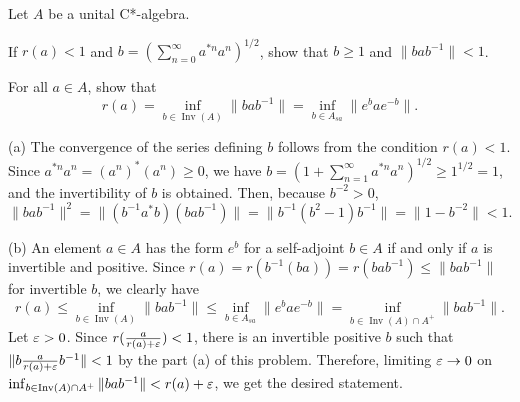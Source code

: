 \documentclass{../../small}
\newcommand{\Inv}{\operatorname{Inv}}
\begin{document}
\begin{prb}
Let $A$ be a unital C*-algebra.
\begin{parts}
\item
If $r(a)<1$ and $b=(\sum_{n=0}^\infty a^{*n}a^n)^{1/2}$, show that $b\ge1$ and $\|bab^{-1}\|<1$.
\item
For all $a\in A$, show that
\[r(a)=\inf_{b\in\Inv(A)}\|bab^{-1}\|=\inf_{b\in A_{sa}}\|e^bae^{-b}\|.\]
\end{parts}
\end{prb}
\begin{sol}
(a)
The convergence of the series defining $b$ follows from the condition $r(a)<1$.
Since $a^{*n}a^n=(a^n)^*(a^n)\ge0$, we have $b=(1+\sum_{n=1}^\infty a^{*n}a^n)^{1/2}\ge1^{1/2}=1$, and the invertibility of $b$ is obtained.
Then, because $b^{-2}>0$,
\[\|bab^{-1}\|^2=\|(b^{-1}a^*b)(bab^{-1})\|=\|b^{-1}(b^2-1)b^{-1}\|=\|1-b^{-2}\|<1.\]

(b)
An element $a\in A$ has the form $e^b$ for a self-adjoint $b\in A$ if and only if $a$ is invertible and positive.
Since $r(a)=r(b^{-1}(ba))=r(bab^{-1})\le\|bab^{-1}\|$ for invertible $b$, we clearly have
\[r(a)\le\inf_{b\in\Inv(A)}\|bab^{-1}\|\le\inf_{b\in A_{sa}}\|e^bae^{-b}\|=\inf_{b\in\Inv(A)\cap A^+}\|bab^{-1}\|.\]
Let $\varepsilon>0$.
Since $r(\frac a{r(a)+\varepsilon})<1$, there is an invertible positive $b$ such that $\|b\frac a{r(a)+\varepsilon}b^{-1}\|<1$ by the part (a) of this problem.
Therefore, limiting $\varepsilon\to0$ on $\inf_{b\in\Inv(A)\cap A^+}\|bab^{-1}\|<r(a)+\e$, we get the desired statement.
\end{sol}
\end{document}
